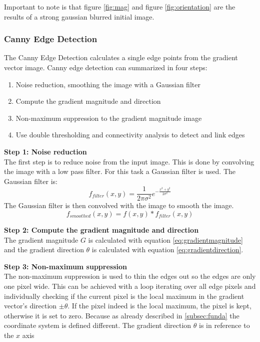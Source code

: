     Important to note is that figure \ref{fig:mag} and figure \ref{fig:orientation} are the results of a strong gaussian blurred initial image. 
    \subsubsection{Canny Edge Detection } 
    The Canny Edge Detection \cite{gonzalez_canny_nodate}calculates a single edge points from the gradient vector image.  
    Canny edge detection can summarized in four steps: 
    \begin{enumerate}
        \item Noise reduction, smoothing the image with a Gaussian filter
        \item Compute the gradient magnitude and direction
        \item Non-maximum suppression to the gradient magnitude image
        \item Use double thresholding and connectivity analysis to detect and link edges
    \end{enumerate}
\textbf{Step 1: Noise reduction} \\
The first step is to reduce noise from the input image. This is done by convolving the image with a low pass filter. For this task a Gaussian filter is used. The Gaussian filter is:
\begin{equation}
    f_{filter}(x,y) = \frac{1}{2\pi\sigma^2}e^{-\frac{x^2+y^2}{2\sigma^2}}
\end{equation}
The Gaussian filter is then convolved with the image to smooth the image. 
\begin{equation}
    f_{smoothed}(x,y) = f(x,y) * f_{filter}(x,y)
\end{equation} 

\textbf{Step 2: Compute the gradient magnitude and direction} \\
The gradient magnitude $G$ is calculated with equation \ref{eq:gradientmagnitude} and the gradient direction $\theta$ is calculated with equation \ref{eq:gradientdirection}.

\textbf{Step 3: Non-maximum suppression} \\
The non-maximum suppression is used to thin the edges out so the edges are only one pixel wide. This can be achieved with a loop iterating over all edge pixels and individually checking if the current pixel is the local maximum in the gradient vector's direction $\pm \theta$. If the pixel indeed is the local maximum, the pixel is kept, otherwise it is set to zero. Because as already described in \ref{subsec:funda} the coordinate system is defined different. The gradient direction $\theta$ is in reference to the $x$ axis

